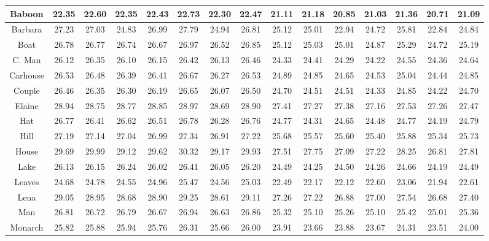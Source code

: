 \begin{table}[t]
\begin{center}
\begin{tabular}{|c||c|c|c|c|c|c|c||c|c|c|c|c|c|c|}
\\
\hline
 Baboon & 22.35  & 22.60 & 22.35 & 22.43  & 22.73& 22.30&22.47     &  21.11&  21.18  & 20.85  & 21.03  & 21.36&20.71 & 21.09
\\
\hline
 Barbara & 27.23  & 27.03  & 24.83  & 26.99 &  27.79&24.94 & 26.81    & 25.12  & 25.01  & 22.94   &  24.72& 25.81 &22.84 &24.84
\\
\hline
  Boat& 26.78 & 26.77  & 26.74  & 26.67 & 26.97  & 26.52 &  26.85   & 25.12 & 25.03 & 25.01 &  24.87&  25.29 & 24.72 &25.19         
\\
\hline
 C. Man   & 26.12 & 26.35   & 26.10 & 26.15 & 26.42& 26.13 & 26.46   & 24.33 & 24.41 &  24.29  & 24.22 &  24.55&24.36 &24.64     
\\
\hline
 Carhouse  & 26.53 & 26.48  &  26.39   & 26.41 & 26.67&26.27 &26.53   &  24.89 & 24.85  &  24.65  & 24.53  &25.04 &24.44&24.85
\\
\hline
 Couple & 26.46 & 26.35  & 26.30 & 26.19 &  26.65&26.07 & 26.50   & 24.70 & 24.51 & 24.51 & 24.33 & 24.85&24.22 &24.70   
\\
\hline
 Elaine &  28.94 & 28.75 & 28.77   & 28.85 & 28.97 &28.69 &28.90    &   27.41  & 27.27 & 27.38  &  27.16 &27.53 &27.26&27.47   
\\
\hline
 Hat  &  26.77 & 26.41 & 26.62  & 26.51 & 26.78& 26.28 &26.76      &   24.77  & 24.31  & 24.65   &  24.48 &24.77&24.19 & 24.79
\\
\hline
 Hill  & 27.19 & 27.14  & 27.04 & 26.99   &27.34& 26.91 &27.22     & 25.68 & 25.57 & 25.60 &  25.40 & 25.88 &25.34 & 25.73
\\
\hline
 House  & 29.69 & 29.99  & 29.12  & 29.62  & 30.32& 29.17 &29.93     & 27.51 & 27.75  &  27.09 &  27.22 & 28.25 &26.81 & 27.81    
\\
\hline
 Lake   &  26.13  & 26.15  & 26.24  &  26.02  & 26.41& 26.05 &26.20    & 24.49 & 24.25 & 24.50 & 24.26 &24.66&24.19 &24.49   
\\
\hline
 Leaves   & 24.68 & 24.78   & 24.55  & 24.96 & 25.47&24.56 &25.03     & 22.49  & 22.17 & 22.12 &  22.60 & 23.06 &21.94& 22.61
\\
\hline
 Lena  & 29.05 & 28.95 & 28.68 & 28.90 &  29.25 &28.61 & 29.11      & 27.26 & 27.22 &  26.88 & 27.00 & 27.54&26.68 &  27.40   
\\
\hline
 Man   & 26.81 & 26.72    & 26.79 & 26.67 &  26.94&26.63 &  26.86   & 25.32 & 25.10  & 25.26  & 25.10 &  25.42 &25.01& 25.36      
\\
\hline
 Monarch  & 25.82 & 25.88 & 25.94 & 25.76 & 26.31&25.66 & 26.00   & 23.91 & 23.66  &  23.88   &  23.67& 24.31 &23.51 & 24.00   

\end{tabular}
\end{center}
\end{table}
